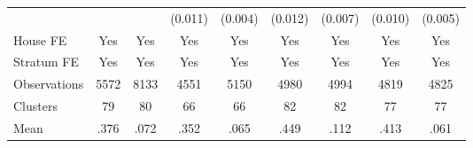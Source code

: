 {\begin{tabular}{l*{8}{c}}
                &                  &                  &  (0.011)         &  (0.004)         &  (0.012)         &  (0.007)         &  (0.010)         &  (0.005)         \\
House FE        &      Yes         &      Yes         &      Yes         &      Yes         &      Yes         &      Yes         &      Yes         &      Yes         \\
Stratum FE      &      Yes         &      Yes         &      Yes         &      Yes         &      Yes         &      Yes         &      Yes         &      Yes         \\
\midrule
Observations    &     5572         &     8133         &     4551         &     5150         &     4980         &     4994         &     4819         &     4825         \\
Clusters        &       79         &       80         &       66         &       66         &       82         &       82         &       77         &       77         \\
Mean            &     .376         &     .072         &     .352         &     .065         &     .449         &     .112         &     .413         &     .061         \\
\bottomrule
\end{tabular}
}
